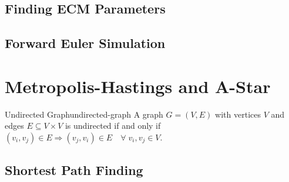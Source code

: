 \documentclass[12pt, a4paper]{article}
\begin{document}
  \subsection{Finding ECM Parameters}
  \begin{figure}[H]
    \captionsetup[subfigure]{justification=centering}
    \centering
    \hfill
    \par
  \end{figure}

  \subsection{Forward Euler Simulation}

  \section{Metropolis-Hastings and A-Star}
  \begin{definition}{Undirected Graph}{undirected-graph}
    A graph $G = (V, E)$ with vertices $V$ and edges $E \subseteq V \times V$ is undirected if and only if $(v_i, v_j) \in E \Rightarrow (v_j, v_i) \in E \quad \forall\; v_i, v_j \in V$.
  \end{definition}

  \subsection{Shortest Path Finding}
\end{document}
